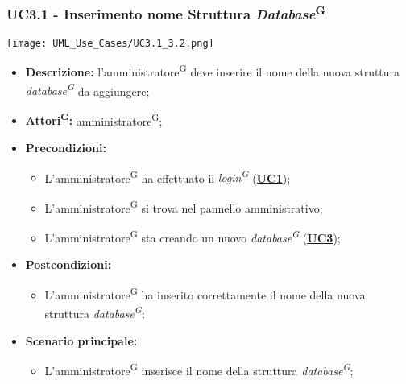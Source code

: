 \subsubsection{UC3.1 - Inserimento nome Struttura \textit{Database}\textsuperscript{G}}
\label{sec:UC3.1}
\texttt{[image: UML\_Use\_Cases/UC3.1\_3.2.png]}
\begin{itemize}
	\item \textbf{Descrizione:} l’amministratore\textsuperscript{G} deve inserire il nome della nuova struttura \textit{database\textsuperscript{G}} da aggiungere;
	\item \textbf{Attori\textsuperscript{G}:} amministratore\textsuperscript{G};
	\item \textbf{Precondizioni:} 
	\begin{itemize}
		\item L’amministratore\textsuperscript{G} ha effettuato il \textit{login\textsuperscript{G}} (\hyperref[sec:UC1]{\textbf{UC1}});
		\item L’amministratore\textsuperscript{G} si trova nel pannello amministrativo;
		\item L’amministratore\textsuperscript{G} sta creando un nuovo \textit{database\textsuperscript{G}} (\hyperref[sec:UC3]{\textbf{UC3}});
	\end{itemize}
	\item \textbf{Postcondizioni:} 
	\begin{itemize}
		\item L'amministratore\textsuperscript{G} ha inserito correttamente il nome della nuova struttura  \textit{database\textsuperscript{G}};
	\end{itemize}
	\item \textbf{Scenario principale:} 
	\begin{itemize}
		\item L’amministratore\textsuperscript{G} inserisce il nome della struttura \textit{database\textsuperscript{G}};
	\end{itemize}
\end{itemize}

